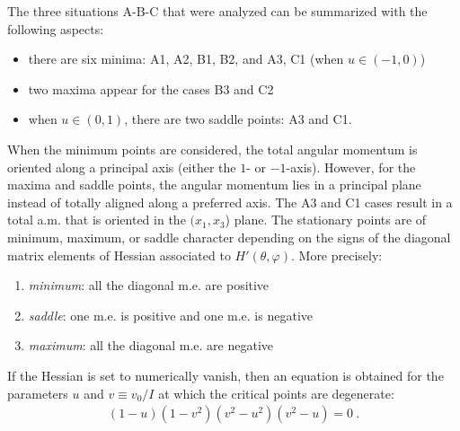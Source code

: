 The three situations A-B-C that were analyzed can be summarized with the following aspects:
\begin{itemize}
    \item there are six minima: A1, A2, B1, B2, and A3, C1 (when $u\in(-1,0)$)
    \item two maxima appear for the cases B3 and C2
    \item when $u\in(0,1)$, there are two saddle points: A3 and C1.
\end{itemize}

When the minimum points are considered, the total angular momentum is oriented along a principal axis (either the $1$- or $-1$-axis). However, for the maxima and saddle points, the angular momentum lies in a principal plane instead of totally aligned along a preferred axis. The A3 and C1 cases result in a total a.m. that is oriented in the $(x_1,x_3$) plane. The stationary points are of minimum, maximum, or saddle character depending on the signs of the diagonal matrix elements of Hessian associated to $H'(\theta,\varphi)$. More precisely:
\begin{enumerate}
    \item \emph{minimum}: all the diagonal m.e. are positive
    \item \emph{saddle}: one m.e. is positive and one m.e. is negative
    \item \emph{maximum}: all the diagonal m.e. are negative
\end{enumerate}

If the Hessian is set to numerically vanish, then an equation is obtained for the parameters $u$ and $v\equiv v_0/I$ at which the critical points are degenerate:
\begin{align}
    (1-u)(1-v^2)(v^2-u^2)(v^2-u)=0\ .
    \label{new-boson-phase-diagram-parameter-equation}
\end{align}

